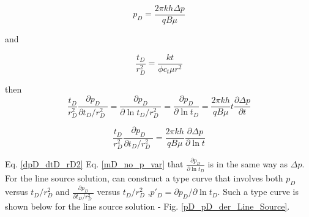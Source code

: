 \documentclass{llncs}
\numberwithin{equation}{section}
\numberwithin{figure}{section}
\numberwithin{table}{section}
\begin{document}
    \begin{equation*}
    {{p}_{D}}=\frac{2\pi kh\Delta p}{qB\mu }
    \end{equation*}

    and

    \begin{equation*}
    \frac{{{t}_{D}}}{r_{D}^{2}}=\frac{kt}{\phi {{c}_{t}}\mu {{r}^{2}}}
    \end{equation*}

    then
    \begin{equation*}
         \frac{{{t}_{D}}}{r_{D}^{2}}\frac{\partial {{p}_{D}}}{\partial {{{t}_{D}}}/{r_{D}^{2}}\;} =\frac{\partial {{p}_{D}}}{\partial \ln {{{t}_{D}}}/{r_{D}^{2}}\;}=\frac{\partial {{p}_{D}}}{\partial \ln {{t}_{D}}}=\frac{2\pi kh}{qB\mu }t\frac{\partial \Delta p}{\partial t}
    \end{equation*}

    \begin{equation}
     \frac{{{t}_{D}}}{r_{D}^{2}}\frac{\partial {{p}_{D}}}{\partial {{{t}_{D}}}/{r_{D}^{2}}\;}=\frac{2\pi kh}{qB\mu }\frac{\partial \Delta p}{\partial \ln t}
        \label{dpD_dtD_rD2}
    \end{equation}

    Eq. \ref{dpD_dtD_rD2}  Eq. \ref{mD_no_p_var}  that $\frac{\partial {{p}_{D}}}{\partial \ln {{t}_{D}}}$ is  in the same way as $\Delta p$.  For the line source solution,  can construct a type curve that involves both $p_{D}$ versus $t_{D}/r_{D}^{2}$ and $\frac{\partial {{p}_{D}}}{\partial {{{t}_{D}}}/{r_{D}^{2}}\;}$ versus $t_{D}/r_{D}^{2}$  ,$p{{'}_{D}}={\partial {{p}_{D}}}/{\partial \ln {{t}_{D}}}$. Such a type curve is shown below for the line source solution - Fig. \ref{pD_pD_der_Line_Source}.
\end{document}
